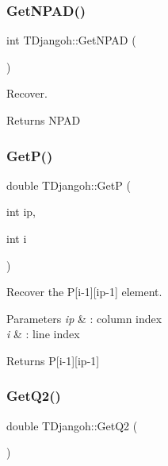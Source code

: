 \subsubsection{\texorpdfstring{Get\+N\+P\+A\+D()}{GetNPAD()}}
{\footnotesize\ttfamily int T\+Djangoh\+::\+Get\+N\+P\+AD (\begin{DoxyParamCaption}{ }\end{DoxyParamCaption})\hspace{0.3cm}{\ttfamily [inline]}}



Recover. 

\begin{DoxyReturn}{Returns}
N\+P\+AD 
\end{DoxyReturn}
\mbox{\label{class_t_djangoh_a2bc14d05d493e604f9f7fef847c19c9b}} 
\subsubsection{\texorpdfstring{Get\+P()}{GetP()}}
{\footnotesize\ttfamily double T\+Djangoh\+::\+GetP (\begin{DoxyParamCaption}\item[{int}]{ip,  }\item[{int}]{i }\end{DoxyParamCaption})\hspace{0.3cm}{\ttfamily [inline]}}



Recover the P\mbox{[}i-\/1\mbox{]}\mbox{[}ip-\/1\mbox{]} element. 


\begin{DoxyParams}{Parameters}
{\em ip} & \+: column index \\
\hline
{\em i} & \+: line index \\
\hline
\end{DoxyParams}
\begin{DoxyReturn}{Returns}
P\mbox{[}i-\/1\mbox{]}\mbox{[}ip-\/1\mbox{]} 
\end{DoxyReturn}
\mbox{\label{class_t_djangoh_afce6f0bfed90b20eb0f9310ae107291d}} 
\subsubsection{\texorpdfstring{Get\+Q2()}{GetQ2()}}
{\footnotesize\ttfamily double T\+Djangoh\+::\+Get\+Q2 (\begin{DoxyParamCaption}{ }\end{DoxyParamCaption})\hspace{0.3cm}{\ttfamily [inline]}}

